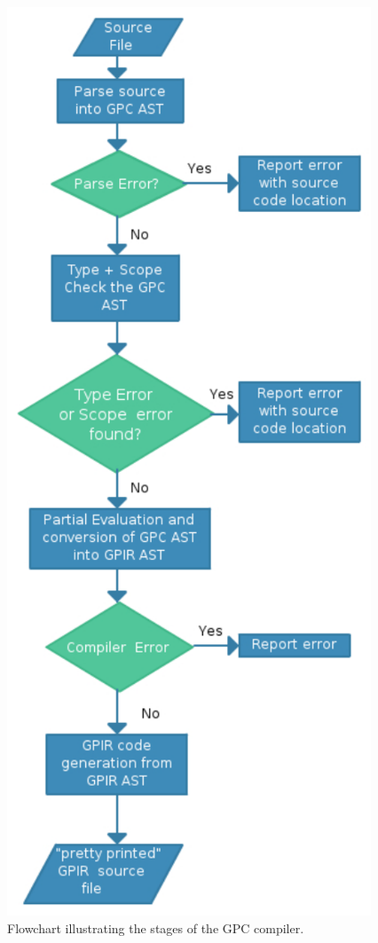 \newpage
\begin{figure}[!htb]
\begin{center}
\includegraphics{graphs/Dissertation.pdf}
\caption{Flowchart illustrating the stages of the GPC compiler.}
\end{center}
\end{figure}

